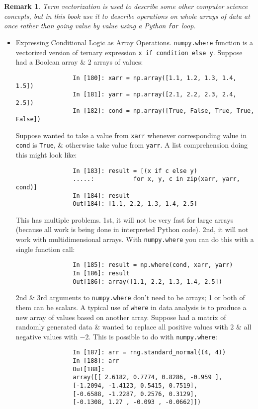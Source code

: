 \documentclass{article}
\newtheorem{remark}{Remark}
\begin{document}
\begin{itemize}
\begin{itemize}
		\begin{remark}
			Term \emph{vectorization} is used to describe some other computer science concepts, but in this book use it to describe operations on whole arrays of data at once rather than going value by value using a Python {\tt for} loop.
		\end{remark}
		\begin{itemize}
			\item {\sf Expressing Conditional Logic as Array Operations.} {\tt numpy.where} function is a vectorized version of ternary expression {\tt x if condition else y}. Suppose had a Boolean array \& 2 arrays of values:
			\begin{verbatim}
				In [180]: xarr = np.array([1.1, 1.2, 1.3, 1.4, 1.5])
				In [181]: yarr = np.array([2.1, 2.2, 2.3, 2.4, 2.5])
				In [182]: cond = np.array([True, False, True, True, False])
			\end{verbatim}
			Suppose wanted to take a value from {\tt xarr} whenever corresponding value in {\tt cond} is {\tt True}, \& otherwise take value from {\tt yarr}. A list comprehension doing this might look like:
			\begin{verbatim}
				In [183]: result = [(x if c else y)
				.....:           for x, y, c in zip(xarr, yarr, cond)]
				In [184]: result
				Out[184]: [1.1, 2.2, 1.3, 1.4, 2.5]
			\end{verbatim}
			This has multiple problems. 1st, it will not be very fast for large arrays (because all work is being done in interpreted Python code). 2nd, it will not work with multidimensional arrays. With {\tt numpy.where} you can do this with a single function call:
			\begin{verbatim}
				In [185]: result = np.where(cond, xarr, yarr)
				In [186]: result
				Out[186]: array([1.1, 2.2, 1.3, 1.4, 2.5])
			\end{verbatim}
			2nd \& 3rd arguments to {\tt numpy.where} don't need to be arrays; 1 or both of them can be scalars. A typical use of {\tt where} in data analysis is to produce a new array of values based on another array. Suppose had a matrix of randomly generated data \& wanted to replace all positive values with 2 \& all negative values with $-2$. This is possible to do with {\tt numpy.where}:
			\begin{verbatim}
				In [187]: arr = rng.standard_normal((4, 4))
				In [188]: arr
				Out[188]:
				array([[ 2.6182, 0.7774, 0.8286, -0.959 ],
				[-1.2094, -1.4123, 0.5415, 0.7519],
				[-0.6588, -1.2287, 0.2576, 0.3129],
				[-0.1308, 1.27 , -0.093 , -0.0662]])

\end{verbatim}
\end{itemize}
\end{itemize}
\end{itemize}
\end{document}
